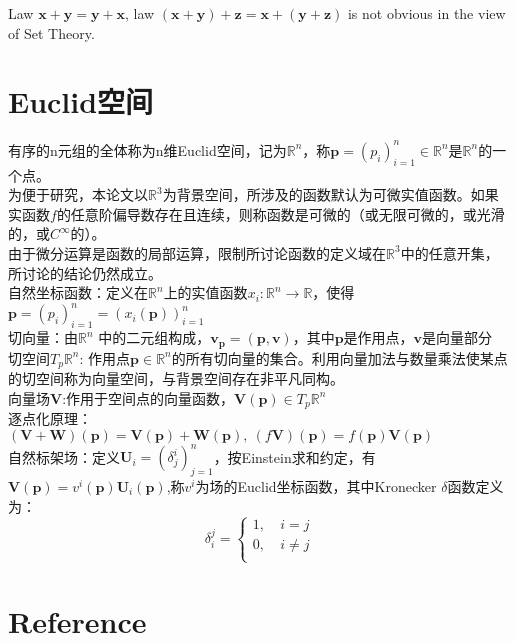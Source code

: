 Law $\boldsymbol{x} + \boldsymbol{y} = \boldsymbol{y} + \boldsymbol{x}$,
law $ (\boldsymbol{x} + \boldsymbol{y} )+ \boldsymbol{z} = \boldsymbol{x} +( \boldsymbol{y} + \boldsymbol{z})$ is not obvious in the view of Set Theory.




\section{Euclid空间}
有序的n元组的全体称为n维Euclid空间，记为$\mathbb R^n$，称$\boldsymbol p=(p_i)_{i=1}^n \in \mathbb R^n$是$\mathbb R^n$的一个点。\\
为便于研究，本论文以$ \mathbb R^3$为背景空间，所涉及的函数默认为可微实值函数。如果实函数$f$的任意阶偏导数存在且连续，则称函数是可微的（或无限可微的，或光滑的，或$C^\infty$的）。\\
由于微分运算是函数的局部运算，限制所讨论函数的定义域在$ \mathbb R^3$中的任意开集，所讨论的结论仍然成立。\\
自然坐标函数：定义在$\mathbb R^n$上的实值函数$x_i: \mathbb R^n \to  \mathbb R$，使得$\boldsymbol p=(p_i)_{i=1}^n = \left( x_i(\boldsymbol p) \right)_{i=1}^n   $\\
切向量：由$\mathbb R^n$ 中的二元组构成，$\boldsymbol v_{\boldsymbol p}=(\boldsymbol p,\boldsymbol v)$，其中$\boldsymbol p$是作用点，$\boldsymbol v$是向量部分\\
切空间$T_p  \mathbb R^n$: 作用点$\boldsymbol p \in \mathbb R^n$的所有切向量的集合。利用向量加法与数量乘法使某点的切空间称为向量空间，与背景空间存在非平凡同构。\\
向量场$\boldsymbol V$:作用于空间点的向量函数，$\boldsymbol V(\boldsymbol p)\in T_p  \mathbb R^n $\\
逐点化原理：$(\boldsymbol V+\boldsymbol W)(\boldsymbol p)=\boldsymbol V(\boldsymbol p)+\boldsymbol W(\boldsymbol p),\ (f \boldsymbol V)(\boldsymbol p)= f(\boldsymbol p)\boldsymbol V (\boldsymbol p)$\\
自然标架场：定义$\boldsymbol U_i=(\delta _j^i)_{j=1}^n$，按Einstein求和约定，有$\boldsymbol V(\boldsymbol p)=v^i(\boldsymbol p)\boldsymbol U_i(\boldsymbol p)$,称$v^i$为场的Euclid坐标函数，其中Kronecker $\delta$函数定义为：
\begin{equation}
\label{Kronecker_delta}
\delta _i^j=\left\{ 
    \begin{aligned}
    1,\  & i =j\\
    0,\  & i \neq j\\
    \end{aligned}
     \right.
\end{equation}


\section{Reference}

